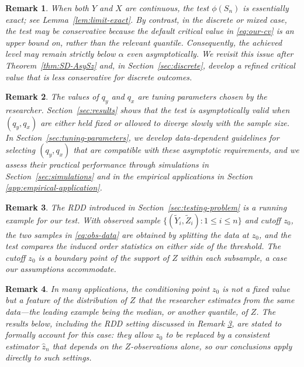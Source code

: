 \documentclass[11pt]{article}
\numberwithin{equation}{section}
\newtheorem{remark}{Remark}%
\begin{document}
\begin{remark}\label{rem:conservative}
  When both $Y$ and $X$ are continuous, the test $\phi(S_n)$ is essentially exact; see Lemma~\ref{lem:limit-exact}. By contrast, in the discrete or mixed case, the test may be conservative because the default critical value in \eqref{eq:our-cv} is an upper bound on, rather than the relevant quantile. Consequently, the achieved level may remain strictly below $\alpha$ even asymptotically. We revisit this issue after Theorem~\ref{thm:SD-AsySz} and, in Section~\ref{sec:discrete}, develop a refined critical value that is less conservative for discrete outcomes.
\end{remark}

\begin{remark}\label{rem:choice-q}
     The values of $q_y$ and $q_x$ are tuning parameters chosen by the researcher. Section~\ref{sec:results} shows that the test is asymptotically valid when $(q_y, q_x)$ are either held fixed or allowed to diverge slowly with the sample size. In Section~\ref{sec:tuning-parameters}, we develop data-dependent guidelines for selecting $(q_y, q_x)$ that are compatible with these asymptotic requirements, and we assess their practical performance through simulations in Section~\ref{sec:simulations} and in the empirical applications in Section \ref{app:empirical-application}.
\end{remark}

\begin{remark}\label{rem:rdd}
  The RDD introduced in Section~\ref{sec:testing-problem} is a running example for our test. With observed sample $\{(\tilde{Y}_i, \tilde{Z}_i): 1 \le i \le n\}$ and cutoff $z_0$, the two samples in \eqref{eq:obs-data} are obtained by splitting the data at $z_0$, and the test compares the induced order statistics on either side of the threshold. The cutoff $z_0$ is a boundary point of the support of $Z$ within each subsample, a case our assumptions accommodate. 
\end{remark}

\begin{remark}\label{rem:estimated-z0}
In many applications, the conditioning point $z_0$ is not a fixed value but a feature of the distribution of $Z$ that the researcher estimates from the same data---the leading example being the median, or another quantile, of $Z$. The results below, including the RDD setting discussed in Remark \ref{rem:rdd}, are stated to formally account for this case: they allow $z_0$ to be replaced by a consistent estimator $\hat z_n$ that depends on the $Z$-observations alone, so our conclusions apply directly to such settings.
\end{remark}
\end{document}
